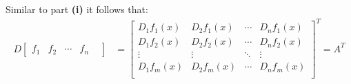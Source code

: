 \documentclass[letterpaper,12pt]{article}
\theoremstyle{definition}
\begin{document}
Similar to part \textbf{(i)} it follows that:
\begin{align*}
    D\begin{bmatrix}
        f_1 &
        f_2 &
        \cdots &
        f_n &
    \end{bmatrix}
    &= 
    \begin{bmatrix}
    D_1f_1(x) &D_2f_1(x) & \cdots &D_nf_1(x)  \\
    D_1f_2(x) &D_2f_2(x) & \cdots &D_nf_2(x)  \\
    \vdots & \vdots & \ddots & \vdots \\
    D_1f_m(x) &D_2f_m(x) & \cdots &D_nf_m(x)  \\
    \end{bmatrix}^T = A^T
\end{align*}
\end{document}
